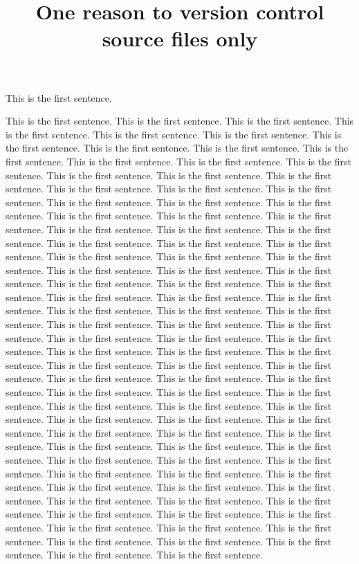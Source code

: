 \documentclass{article}
\title{One reason to version control source files only}
\begin{document}
\maketitle

This is the first sentence.

This is the first sentence.
This is the first sentence.
This is the first sentence.
This is the first sentence.
This is the first sentence.
This is the first sentence.
This is the first sentence.
This is the first sentence.
This is the first sentence.
This is the first sentence.
This is the first sentence.
This is the first sentence.
This is the first sentence.
This is the first sentence.
This is the first sentence.
This is the first sentence.
This is the first sentence.
This is the first sentence.
This is the first sentence.
This is the first sentence.
This is the first sentence.
This is the first sentence.
This is the first sentence.
This is the first sentence.
This is the first sentence.
This is the first sentence.
This is the first sentence.
This is the first sentence.
This is the first sentence.
This is the first sentence.
This is the first sentence.
This is the first sentence.
This is the first sentence.
This is the first sentence.
This is the first sentence.
This is the first sentence.
This is the first sentence.
This is the first sentence.
This is the first sentence.
This is the first sentence.
This is the first sentence.
This is the first sentence.
This is the first sentence.
This is the first sentence.
This is the first sentence.
This is the first sentence.
This is the first sentence.
This is the first sentence.
This is the first sentence.
This is the first sentence.
This is the first sentence.
This is the first sentence.
This is the first sentence.
This is the first sentence.
This is the first sentence.
This is the first sentence.
This is the first sentence.
This is the first sentence.
This is the first sentence.
This is the first sentence.
This is the first sentence.
This is the first sentence.
This is the first sentence.
This is the first sentence.
This is the first sentence.
This is the first sentence.
This is the first sentence.
This is the first sentence.
This is the first sentence.
This is the first sentence.
This is the first sentence.
This is the first sentence.
This is the first sentence.
This is the first sentence.
This is the first sentence.
This is the first sentence.
This is the first sentence.
This is the first sentence.
This is the first sentence.
This is the first sentence.
This is the first sentence.
This is the first sentence.
This is the first sentence.
This is the first sentence.
This is the first sentence.
This is the first sentence.
This is the first sentence.
This is the first sentence.
This is the first sentence.
This is the first sentence.
This is the first sentence.
This is the first sentence.
This is the first sentence.
This is the first sentence.
This is the first sentence.
This is the first sentence.
This is the first sentence.
This is the first sentence.
This is the first sentence.
\end{document}
